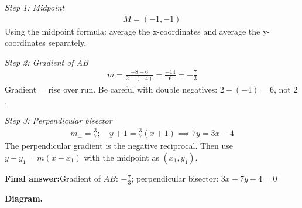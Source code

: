 \documentclass[11pt]{article}
\begin{document}
\textit{Step 1: Midpoint}
\[\begin{gathered}
M = (-1, -1)
\end{gathered}\]
Using the midpoint formula: average the x-coordinates and average the y-coordinates separately.

\textit{Step 2: Gradient of AB}
\[\begin{gathered}
m = \frac{-8-6}{2-(-4)} = \frac{-14}{6} = -\frac{7}{3}
\end{gathered}\]
Gradient = rise over run. Be careful with double negatives: \(2 - (-4) = 6\), not \(2\).

\textit{Step 3: Perpendicular bisector}
\[\begin{gathered}
m_{\perp} = \frac{3}{7}; \quad y + 1 = \frac{3}{7}(x + 1) \implies 7y = 3x - 4
\end{gathered}\]
The perpendicular gradient is the negative reciprocal. Then use \(y - y_1 = m(x - x_1)\) with the midpoint as \((x_1, y_1)\).

\begin{answerbox}
\textbf{Final answer:}\quad Gradient of \(\displaystyle AB\): \(\displaystyle -\frac{7}{3}\); perpendicular bisector: \(\displaystyle 3x - 7y - 4 = 0\)
\end{answerbox}
\textbf{Diagram.}
\end{document}

